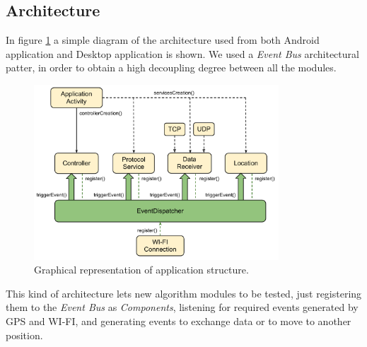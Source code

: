 \subsection{Architecture}

In figure \ref{fig:architecture} a simple diagram of the architecture used from both Android application and Desktop application is shown. We used a \textit{Event Bus} architectural patter, in order to obtain a high decoupling degree between all the modules.

\begin{figure}[htbp]
	\centering
	\includegraphics[trim = 10mm 0mm 0mm 0mm,width=3.6in]{imgs/components_architecture.pdf}
	\caption{Graphical representation of application structure.}
	\label{fig:architecture}
\end{figure}

This kind of architecture lets new algorithm modules to be tested, just registering them to the \textit{Event Bus} as \textit{Components}, listening for required events generated by GPS and WI-FI, and generating events to exchange data or to move to another position.

